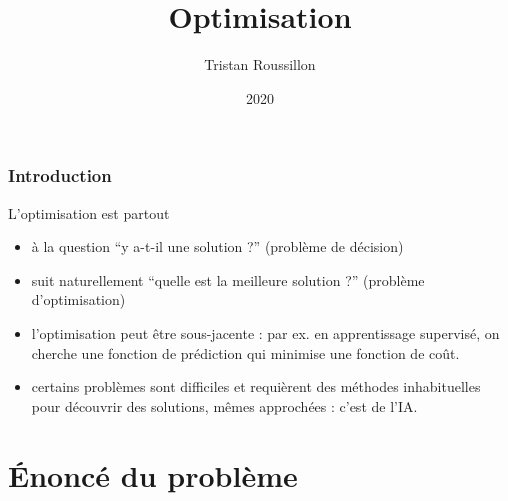 \documentclass{beamer}
\title[]
 {Optimisation}
\author[T. Roussillon]
 {Tristan Roussillon}
\date{2020}
\institute{INSA Lyon, TC}
\begin{document}
\begin{frame}
  \titlepage
\end{frame}

\begin{frame}
  \frametitle{Introduction}

  \begin{block}{L'optimisation est partout}
  \begin{itemize}
  \item à la question ``y a-t-il une solution ?'' (problème de décision)
  \item suit naturellement ``quelle est la meilleure solution ?'' (problème d'optimisation)
  \item l'optimisation peut être sous-jacente : par ex. en apprentissage supervisé, on cherche
    une fonction de prédiction qui minimise une fonction de coût.
  \item certains problèmes sont difficiles et requièrent des méthodes inhabituelles pour découvrir
    des solutions, mêmes approchées : c'est de l'IA.
  \end{itemize}
  \end{block}
  
\end{frame}



\section{\'Enoncé du problème}
\end{document}
